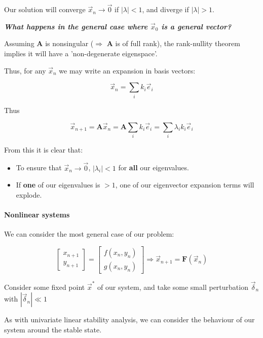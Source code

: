 \documentclass[11pt]{article}
\providecommand{\tightlist}{%
      \setlength{\itemsep}{0pt}\setlength{\parskip}{0pt}}
\begin{document}
Our solution will converge \(\vec{x}_n \to \vec{0}\) if
\(|\lambda| < 1\), and diverge if \(|\lambda| > 1\).

\textbf{\emph{What happens in the general case where \(\vec{x}_0\) is a
general vector?}}

Assuming \(\mathbf{A}\) is nonsingular (\(\Rightarrow\) \(\mathbf{A}\)
is of full rank), the rank-nullity theorem implies it will have a
'non-degenerate eigenspace'.

Thus, for any \(\vec{x}_n\) we may write an expansion in basis vectors:

\[\vec{x}_n = \sum_i k_i \vec{e}_i\]

Thus

\[\vec{x}_{n+1} = \mathbf{A}\vec{x}_n = \mathbf{A}\sum_i k_i\vec{e}_i = \sum_i \lambda_ik_i\vec{e}_i\]

From this it is clear that:

\begin{itemize}
\tightlist
\item
  To ensure that \(\vec{x}_n \to \vec{0}\), \(|\lambda_i| < 1\) for
  \textbf{all} our eigenvalues.
\item
  If \textbf{one} of our eigenvalues is \(>1\), one of our eigenvector
  expansion terms will explode.
\end{itemize}

\paragraph{Nonlinear systems}\label{nonlinear-systems}

We can consider the most general case of our problem:

\begin{equation}
\begin{bmatrix}x_{n+1}\\y_{n+1}\end{bmatrix} = \begin{bmatrix}f(x_n, y_n)\\g(x_n, y_n)\end{bmatrix} \Rightarrow \vec{x}_{n+1} = \mathbf{F}(\vec{x}_n)
\end{equation}

Consider some fixed point \(\vec{x}^*\) of our system, and take some
small perturbation \(\vec{\delta}_n\) with \(|\vec{\delta}_n| \ll 1\)

As with univariate linear stability analysis, we can consider the
behaviour of our system around the stable state.
\end{document}

